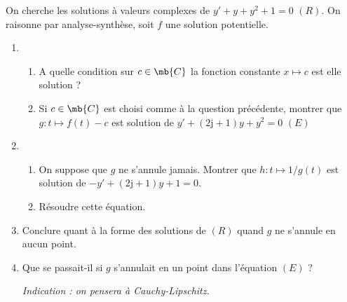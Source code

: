 
On cherche les solutions à valeurs complexes de $y' + y + y^2 + 1 = 0$ $(R)$. On raisonne par analyse-synthèse, soit $f$ une solution potentielle.

\begin{enumerate}

\item  \begin{enumerate}

\item A quelle condition sur $c \in \mb{C}$ la fonction constante $x \mapsto c$ est elle solution ?

\item Si $c \in \mb{C}$ est choisi comme à la question précédente, montrer que $g : t \mapsto f(t) -c$ est solution de $y' + (2\text{j} +1) y + y^2 = 0$ $(E)$

\end{enumerate}
 
\item \begin{enumerate}
\item On suppose que $g$ ne s'annule jamais. Montrer que $h : t \mapsto 1/g(t)$ est solution de $-y' + (2 \text{j}+1)y +1 = 0$.

\item Résoudre cette équation.

\end{enumerate}


\item Conclure quant à la forme des solutions de $(R)$ quand $g$ ne s'annule en aucun point.

\item Que se passait-il si $g$ s'annulait en un point dans l'équation $(E)$ ?

\emph{Indication : on pensera à Cauchy-Lipschitz.}
\end{enumerate}




